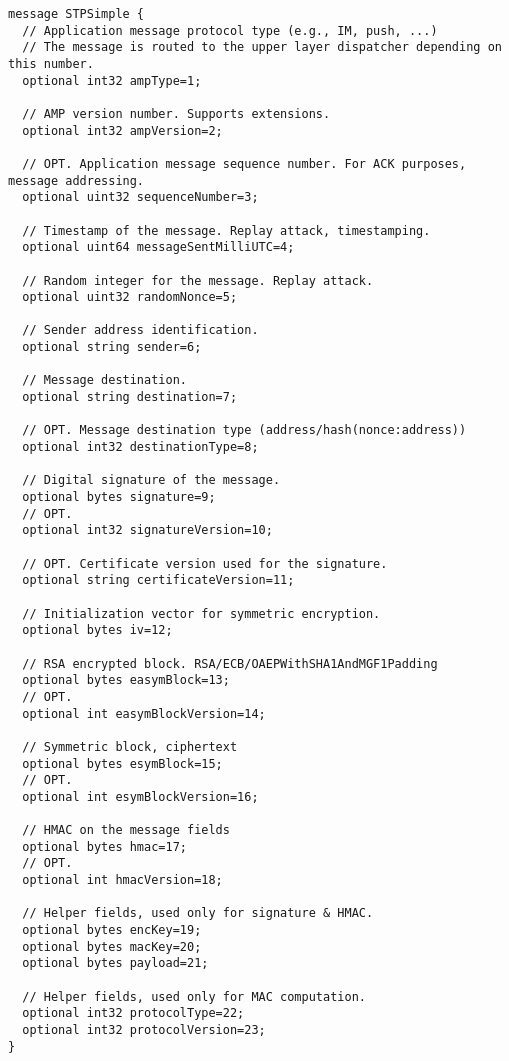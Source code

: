 \documentclass[a4paper,10pt]{article}
\begin{document}
\begin{Verbatim}[frame=single]
message STPSimple {
  // Application message protocol type (e.g., IM, push, ...)
  // The message is routed to the upper layer dispatcher depending on this number.
  optional int32 ampType=1;
  
  // AMP version number. Supports extensions.
  optional int32 ampVersion=2;
  
  // OPT. Application message sequence number. For ACK purposes, message addressing.
  optional uint32 sequenceNumber=3;
  
  // Timestamp of the message. Replay attack, timestamping.
  optional uint64 messageSentMilliUTC=4;
  
  // Random integer for the message. Replay attack.
  optional uint32 randomNonce=5;
  
  // Sender address identification.
  optional string sender=6;
  
  // Message destination.
  optional string destination=7;
  
  // OPT. Message destination type (address/hash(nonce:address))
  optional int32 destinationType=8;
  
  // Digital signature of the message.
  optional bytes signature=9;
  // OPT.
  optional int32 signatureVersion=10;
  
  // OPT. Certificate version used for the signature.
  optional string certificateVersion=11;
  
  // Initialization vector for symmetric encryption.
  optional bytes iv=12;
  
  // RSA encrypted block. RSA/ECB/OAEPWithSHA1AndMGF1Padding
  optional bytes easymBlock=13;
  // OPT.
  optional int easymBlockVersion=14;
  
  // Symmetric block, ciphertext
  optional bytes esymBlock=15;
  // OPT.
  optional int esymBlockVersion=16;
  
  // HMAC on the message fields
  optional bytes hmac=17;
  // OPT.
  optional int hmacVersion=18;
  
  // Helper fields, used only for signature & HMAC.
  optional bytes encKey=19;
  optional bytes macKey=20;
  optional bytes payload=21;
  
  // Helper fields, used only for MAC computation. 
  optional int32 protocolType=22;
  optional int32 protocolVersion=23;
}
\end{Verbatim} 
\end{document}
